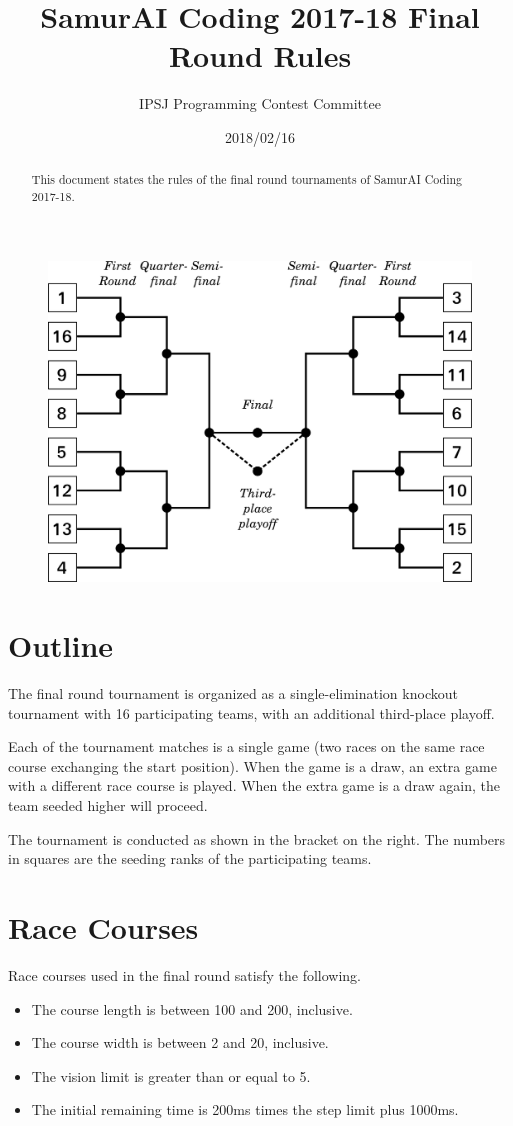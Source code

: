 \documentclass[11pt]{article}
\title{SamurAI Coding 2017-18 Final Round Rules}
\author{IPSJ Programming Contest Committee}
\date{2018/02/16}
\begin{document}
\maketitle

\begin{abstract}
This document states the rules of the final round tournaments of
SamurAI Coding 2017-18.
\end{abstract}

\begin{figure}
  \begin{flushright}
  \vspace{-2cm}
  \includegraphics[width=0.5\columnwidth]{tournament-table-en.png}
  \vspace{-1cm}
  \end{flushright}
\end{figure}

\section{Outline}

The final round tournament is organized as a single-elimination
knockout tournament with 16 participating teams, with an additional
third-place playoff.

Each of the tournament matches is a single game (two races on the same
race course exchanging the start position).  When the game is a draw,
an extra game with a different race course is played.  When the
extra game is a draw again, the team seeded higher will proceed.

The tournament is conducted as shown in the bracket on the right.  The
numbers in squares are the seeding ranks of the participating teams.

\section{Race Courses}
Race courses used in the final round satisfy the following.
\begin{itemize}
\item The course length is between 100 and 200, inclusive.
\item The course width is between 2 and 20, inclusive.
\item The vision limit is greater than or equal to 5.
\item The initial remaining time is 200ms times the step limit plus 1000ms.
\end{itemize}
\end{document}

